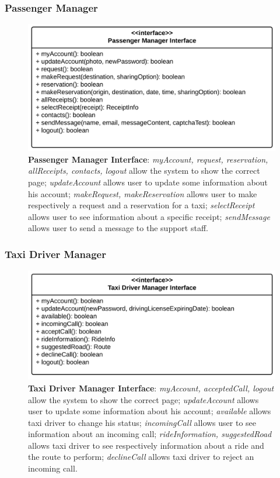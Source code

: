 \subsubsection{Passenger Manager}
\begin{figure}[htbp]
\centering
\includegraphics[width=\textwidth]{cpt/img/ComponentInterfacesPassengerManagerInterface}
\caption{\textbf{Passenger Manager Interface}: \textit{myAccount, request, reservation, allReceipts, contacts, logout} allow the system to show the correct page; \textit{updateAccount} allows user to update some information about his account; \textit{makeRequest, makeReservation} allows user to make respectively a request and a reservation for a taxi; \textit{selectReceipt} allows user to see information about a specific receipt; \textit{sendMessage} allows user to send a message to the support staff.
}
\end{figure}
\clearpage

\subsubsection{Taxi Driver Manager}
\begin{figure}[htbp]
\centering
\includegraphics[width=\textwidth]{cpt/img/ComponentInterfacesTaxiDriverManagerInterface}
\caption{\textbf{Taxi Driver Manager Interface}: \textit{myAccount, acceptedCall, logout} allow the system to show the correct page; \textit{updateAccount} allows user to update some information about his account; \textit{available} allows taxi driver to change his status; \textit{incomingCall} allows user to see information about an incoming call; \textit{rideInformation, suggestedRoad} allows taxi driver to see respectively information about a ride and the route to perform; \textit{declineCall} allows taxi driver to reject an incoming call.
}
\end{figure}
\clearpage

